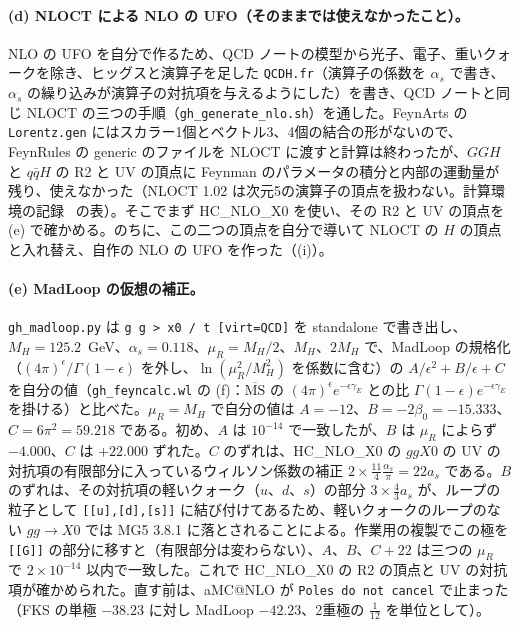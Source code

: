 \documentclass[a4paper,10pt]{ltjsarticle}
\newcommand{\MSbar}{\overline{\mathrm{MS}}}
\begin{document}
\paragraph{(d) NLOCT による NLO の UFO（そのままでは使えなかったこと）。}NLO の UFO を自分で作るため、QCD ノートの模型から光子、電子、重いクォークを除き、ヒッグスと演算子を足した \texttt{QCDH.fr}（演算子の係数を $\alpha_s$ で書き、$\alpha_s$ の繰り込みが演算子の対抗項を与えるようにした）を書き、QCD ノートと同じ NLOCT の三つの手順（\texttt{gh\_generate\_nlo.sh}）を通した。FeynArts の \texttt{Lorentz.gen} にはスカラー1個とベクトル3、4個の結合の形がないので、FeynRules の generic のファイルを NLOCT に渡すと計算は終わったが、$GGH$ と $q\bar qH$ の R2 と UV の頂点に Feynman のパラメータの積分と内部の運動量が残り、使えなかった（NLOCT 1.02 は次元5の演算子の頂点を扱わない。計算環境の記録~\cite{env} の表）。そこでまず HC\_NLO\_X0 を使い、その R2 と UV の頂点を (e) で確かめる。のちに、この二つの頂点を自分で導いて NLOCT の $H$ の頂点と入れ替え、自作の NLO の UFO を作った（(i)）。

\paragraph{(e) MadLoop の仮想の補正。}\texttt{gh\_madloop.py} は \texttt{g g > x0 / t [virt=QCD]} を standalone で書き出し、$M_H=125.2$~GeV、$\alpha_s=0.118$、$\mu_R=M_H/2$、$M_H$、$2M_H$ で、MadLoop の規格化（$(4\pi)^\epsilon/\Gamma(1-\epsilon)$ を外し、$\ln(\mu_R^2/M_H^2)$ を係数に含む）の $A/\epsilon^2+B/\epsilon+C$ を自分の値（\texttt{gh\_feyncalc.wl} の (f)：$\MSbar$ の $(4\pi)^\epsilon e^{-\epsilon\gamma_E}$ との比 $\Gamma(1-\epsilon)e^{-\epsilon\gamma_E}$ を掛ける）と比べた。$\mu_R=M_H$ で自分の値は $A=-12$、$B=-2\beta_0=-15.333$、$C=6\pi^2=59.218$ である。初め、$A$ は $10^{-14}$ で一致したが、$B$ は $\mu_R$ によらず $-4.000$、$C$ は $+22.000$ ずれた。$C$ のずれは、HC\_NLO\_X0 の $ggX0$ の UV の対抗項の有限部分に入っているウィルソン係数の補正 $2\times\frac{11}4\frac{\alpha_s}\pi=22a_s$ である。$B$ のずれは、その対抗項の軽いクォーク（$u$、$d$、$s$）の部分 $3\times\frac43a_s$ が、ループの粒子として \texttt{[[u],[d],[s]]} に結び付けてあるため、軽いクォークのループのない $gg\to X0$ では MG5 3.8.1 に落とされることによる。作業用の複製でこの極を \texttt{[[G]]} の部分に移すと（有限部分は変わらない）、$A$、$B$、$C+22$ は三つの $\mu_R$ で $2\times10^{-14}$ 以内で一致した。これで HC\_NLO\_X0 の R2 の頂点と UV の対抗項が確かめられた。直す前は、aMC@NLO が \texttt{Poles do not cancel} で止まった（FKS の単極 $-38.23$ に対し MadLoop $-42.23$、2重極の $\frac1{12}$ を単位として）。
\end{document}
